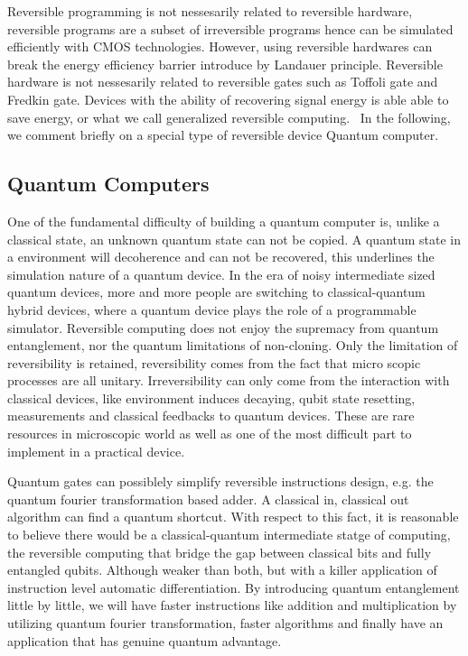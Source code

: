 \documentclass[aps,twocolumn,longbibliography,english,superscriptaddress,prr]{revtex4-1}
\newcommand{\<}{\langle}
\renewcommand{\>}{\rangle}
\theoremstyle{definition}\newtheorem{definition}{\textit{Definition}}
\begin{document}
Reversible programming is not nessesarily related to reversible hardware, reversible programs are a subset of irreversible programs hence can be simulated efficiently with CMOS technologies. However, using reversible hardwares can break the energy efficiency barrier introduce by Landauer principle.
Reversible hardware is not nessesarily related to reversible gates such as Toffoli gate and Fredkin gate.
Devices with the ability of recovering signal energy is able able to save energy, or what we call generalized reversible computing.~\cite{Frank2005,Frank2017b}
In the following, we comment briefly on a special type of reversible device Quantum computer.

\subsection{Quantum Computers}
One of the fundamental difficulty of building a quantum computer is, unlike a classical state, an unknown quantum state can not be copied.
A quantum state in a environment will decoherence and can not be recovered, this underlines the simulation nature of a quantum device.
In the era of noisy intermediate sized quantum devices, more and more people are switching to classical-quantum hybrid devices, where a quantum device plays the role of a programmable simulator.
Reversible computing does not enjoy the supremacy from quantum entanglement, nor the quantum limitations of non-cloning.
Only the limitation of reversibility is retained, reversibility comes from the fact that micro scopic processes are all unitary.
Irreversibility can only come from the interaction with classical devices, like environment induces decaying, qubit state resetting, measurements and classical feedbacks to quantum devices. These are rare resources in microscopic world as well as one of the most difficult part to implement in a practical device.

Quantum gates can possiblely simplify reversible instructions design, e.g. the quantum fourier transformation based adder.
A classical in, classical out algorithm can find a quantum shortcut.
With respect to this fact, it is reasonable to believe there would be a classical-quantum intermediate statge of computing,
the reversible computing that bridge the gap between classical bits and fully entangled qubits.
Although weaker than both, but with a killer application of instruction level automatic differentiation.
By introducing quantum entanglement little by little, we will have faster instructions like addition and multiplication by utilizing quantum fourier transformation, faster algorithms and finally have an application that has genuine quantum advantage.
\end{document}
